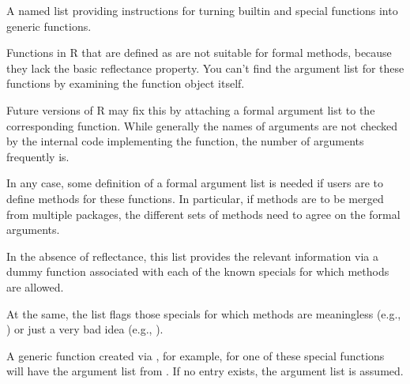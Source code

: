 \begin{Description}\relax
A named list providing instructions for turning builtin and special
functions into generic functions.

Functions in R that are defined as  are not
suitable for formal methods, because they lack the basic reflectance
property.  You can't find the argument list for these functions by
examining the function object itself.

Future versions of R may fix this by attaching a formal argument list
to the corresponding function.  While generally the names of arguments
are not checked by the internal code implementing the function, the
number of arguments frequently is.

In any case, some definition of a formal argument list is needed if
users are to define methods for these functions.  In particular, if
methods are to be merged from multiple packages, the different sets
of methods need to agree on the formal arguments.

In the absence of reflectance, this list provides the relevant
information  via a dummy function associated with each of the known
specials for which methods are allowed.

At the same, the list flags those specials for which methods are
meaningless (e.g., ) or just a very bad idea (e.g.,
).

A generic function created via , for
example, for one of these special functions will have the argument
list from .  If no entry exists, the argument
list   is assumed.
\end{Description}
